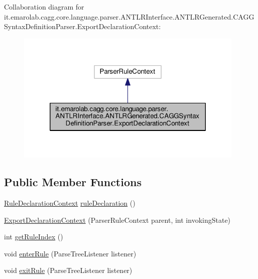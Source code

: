 Collaboration diagram for it.\-emarolab.\-cagg.\-core.\-language.\-parser.\-A\-N\-T\-L\-R\-Interface.\-A\-N\-T\-L\-R\-Generated.\-C\-A\-G\-G\-Syntax\-Definition\-Parser.\-Export\-Declaration\-Context\-:
\nopagebreak
\begin{figure}[H]
\begin{center}
\leavevmode
\includegraphics[width=310pt]{classit_1_1emarolab_1_1cagg_1_1core_1_1language_1_1parser_1_1ANTLRInterface_1_1ANTLRGenerated_1_7121cf23b6213b8f064359aa8cf75e6a}
\end{center}
\end{figure}
\subsection*{Public Member Functions}
\begin{DoxyCompactItemize}
\item 
\hyperlink{classit_1_1emarolab_1_1cagg_1_1core_1_1language_1_1parser_1_1ANTLRInterface_1_1ANTLRGenerated_1_632d39d35185b34ff726726c3c8fa6b6}{Rule\-Declaration\-Context} \hyperlink{classit_1_1emarolab_1_1cagg_1_1core_1_1language_1_1parser_1_1ANTLRInterface_1_1ANTLRGenerated_1_f2ce61382cbd60c083a2c9ee089270d2_a95f63d961e069952cf61df972a1f57ee}{rule\-Declaration} ()
\item 
\hyperlink{classit_1_1emarolab_1_1cagg_1_1core_1_1language_1_1parser_1_1ANTLRInterface_1_1ANTLRGenerated_1_f2ce61382cbd60c083a2c9ee089270d2_a9516db4e3bdeb816b20e00996b0de029}{Export\-Declaration\-Context} (Parser\-Rule\-Context parent, int invoking\-State)
\item 
int \hyperlink{classit_1_1emarolab_1_1cagg_1_1core_1_1language_1_1parser_1_1ANTLRInterface_1_1ANTLRGenerated_1_f2ce61382cbd60c083a2c9ee089270d2_a18dbc3d169137fc7f4c122a2152618a6}{get\-Rule\-Index} ()
\item 
void \hyperlink{classit_1_1emarolab_1_1cagg_1_1core_1_1language_1_1parser_1_1ANTLRInterface_1_1ANTLRGenerated_1_f2ce61382cbd60c083a2c9ee089270d2_a5bcc7cd5c0ae6d30b93e8cc6f7bbd175}{enter\-Rule} (Parse\-Tree\-Listener listener)
\item 
void \hyperlink{classit_1_1emarolab_1_1cagg_1_1core_1_1language_1_1parser_1_1ANTLRInterface_1_1ANTLRGenerated_1_f2ce61382cbd60c083a2c9ee089270d2_a25aef221c566a1e05b736582f59cc495}{exit\-Rule} (Parse\-Tree\-Listener listener)
\end{DoxyCompactItemize}



